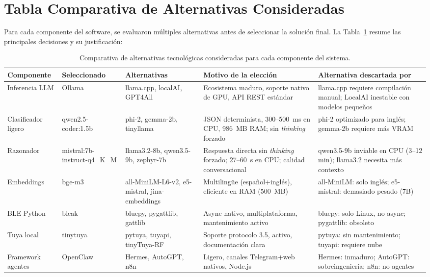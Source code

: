 \section{Tabla Comparativa de Alternativas Consideradas}

Para cada componente del software, se evaluaron múltiples alternativas antes de seleccionar la solución final. La Tabla~\ref{tab:alternativas} resume las principales decisiones y su justificación:

\begin{table}[ht]
\centering
\footnotesize
\setlength{\tabcolsep}{4pt}
\begin{tabular}{|p{2.3cm}|p{2.0cm}|p{2.3cm}|p{3.5cm}|p{2.8cm}|}
\hline
\textbf{Componente} & \textbf{Seleccionado} & \textbf{Alternativas} & \textbf{Motivo de la elección} & \textbf{Alternativa descartada por} \\
\hline
Inferencia LLM & Ollama & llama.cpp, localAI, GPT4All & Ecosistema maduro, soporte nativo de GPU, API REST estándar~\cite{ollama} & llama.cpp requiere compilación manual; LocalAI inestable con modelos pequeños \\
\hline
Clasificador ligero & qwen2.5-coder:1.5b & phi-2, gemma-2b, tinyllama & JSON determinista, 300--500~ms en CPU, 986~MB RAM; sin \textit{thinking} forzado & phi-2 optimizado para inglés; gemma-2b requiere más VRAM \\
\hline
Razonador & mistral:7b-instruct-q4\_K\_M & llama3.2-8b, qwen3.5-9b, zephyr-7b & Respuesta directa sin \textit{thinking} forzado; 27--60~s en CPU; calidad conversacional~\cite{mistral_7b} & qwen3.5-9b inviable en CPU (3--12 min); llama3.2 necesita más contexto \\
\hline
Embeddings & bge-m3 & all-MiniLM-L6-v2, e5-mistral, jina-embeddings & Multilingüe (español+inglés), eficiente en RAM (500~MB)~\cite{bge_m3} & all-MiniLM: solo inglés; e5-mistral: demasiado pesado (7B) \\
\hline
BLE Python & bleak & bluepy, pygattlib, gattlib & Async nativo, multiplataforma, mantenimiento activo~\cite{bleak} & bluepy: solo Linux, no async; pygattlib: obsoleto \\
\hline
Tuya local & tinytuya & pytuya, tuyapi, tinyTuya-RF & Soporte protocolo 3.5, activo, documentación clara~\cite{tinytuya} & pytuya: sin mantenimiento; tuyapi: requiere nube \\
\hline
Framework agentes & OpenClaw & Hermes, AutoGPT, n8n & Ligero, canales Telegram+web nativos, Node.js~\cite{openclaw} & Hermes: inmaduro; AutoGPT: sobreingeniería; n8n: no agentes \\
\hline
\end{tabular}
\caption{Comparativa de alternativas tecnológicas consideradas para cada componente del sistema.}
\label{tab:alternativas}
\end{table}

